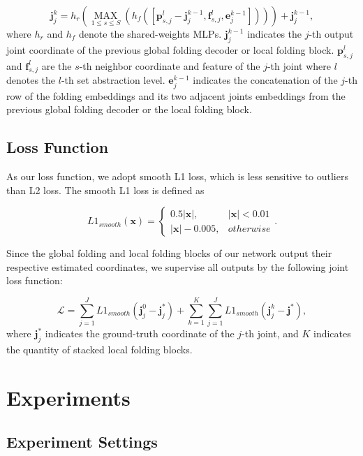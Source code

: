 \documentclass[10pt,twocolumn,letterpaper]{article}
\begin{document}
\begin{equation}
\textbf{j}^k_j = h_r(\mathop{MAX}\limits_{ 1\leq s \leq S}(h_f([\textbf{p}_{s,j}^l -\textbf{j}^{k-1}_j, \textbf{f}_{s,j}^l, \textbf{e}^{k-1}_j]))) + \textbf{j}_j^{k-1},
\end{equation}
where $h_r$ and $h_f$ denote the shared-weights MLPs. $\textbf{j}^{k-1}_j$ indicates the $j$-th output joint coordinate of the previous global folding decoder or local folding block. $\textbf{p}_{s,j}^l$ and $\textbf{f}_{s,j}^l$ are the $s$-th neighbor coordinate and feature of the $j$-th joint where $l$ denotes the $l$-th set abstraction level. 
$\textbf{e}^{k-1}_j$ indicates the concatenation of the $j$-th row of the folding embeddings and its two adjacent joints embeddings from the previous global folding decoder or the local folding block.




\subsection{Loss Function}
As our loss function, we adopt smooth L1 loss, which is less sensitive to outliers than L2 loss. The smooth L1 loss is defined as

\begin{equation}
	L1_{smooth}(\textbf{x}) = \begin{cases}
	0.5|\textbf{x}|, &|\textbf{x}|<0.01\\|\textbf{x}|-0.005, &otherwise
		   \end{cases}.
\end{equation}



Since the global folding and local folding blocks of our network output their respective estimated coordinates, we supervise all outputs by the following joint loss function:


\begin{equation}
\mathcal L = \sum_{j=1}^J L1_{smooth}(\textbf{j}^0_j - \textbf{j}_j^*) + \sum_{k=1}^K \sum_{j=1}^J L1_{smooth}(\textbf{j}^k_j - \textbf{j}^*),
\end{equation}
where $ \textbf{j}_j^*$ indicates the ground-truth coordinate of the $j$-th joint, and $K$ indicates the quantity of stacked local folding blocks.

\section{Experiments}

\subsection{Experiment Settings}
\end{document}
